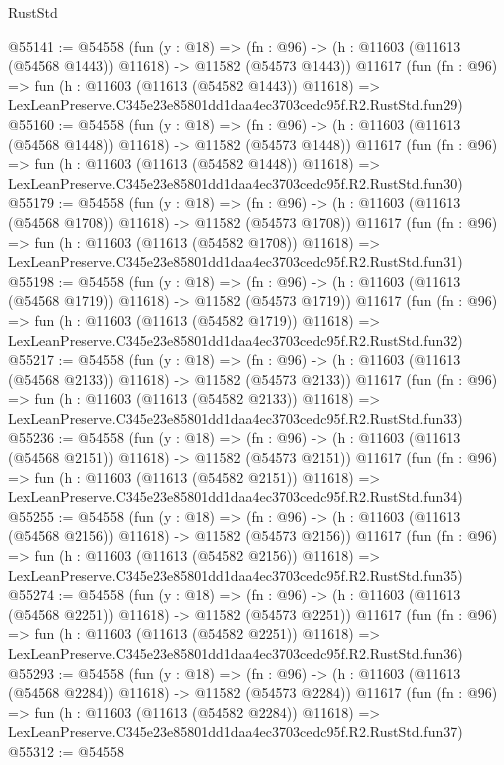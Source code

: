 \begin{lexlean}{RustStd}
\begin{coremodule}
@55141 := @54558
    (fun (y : @18) =>
    (fn : @96) -> (h : @11603 (@11613 (@54568 @1443)) @11618) -> @11582 (@54573 @1443))
    @11617
    (fun (fn : @96) =>
    fun (h : @11603 (@11613 (@54582 @1443)) @11618) =>
    LexLeanPreserve.C345e23e85801dd1daa4ec3703cedc95f.R2.RustStd.fun29)
@55160 := @54558
    (fun (y : @18) =>
    (fn : @96) -> (h : @11603 (@11613 (@54568 @1448)) @11618) -> @11582 (@54573 @1448))
    @11617
    (fun (fn : @96) =>
    fun (h : @11603 (@11613 (@54582 @1448)) @11618) =>
    LexLeanPreserve.C345e23e85801dd1daa4ec3703cedc95f.R2.RustStd.fun30)
@55179 := @54558
    (fun (y : @18) =>
    (fn : @96) -> (h : @11603 (@11613 (@54568 @1708)) @11618) -> @11582 (@54573 @1708))
    @11617
    (fun (fn : @96) =>
    fun (h : @11603 (@11613 (@54582 @1708)) @11618) =>
    LexLeanPreserve.C345e23e85801dd1daa4ec3703cedc95f.R2.RustStd.fun31)
@55198 := @54558
    (fun (y : @18) =>
    (fn : @96) -> (h : @11603 (@11613 (@54568 @1719)) @11618) -> @11582 (@54573 @1719))
    @11617
    (fun (fn : @96) =>
    fun (h : @11603 (@11613 (@54582 @1719)) @11618) =>
    LexLeanPreserve.C345e23e85801dd1daa4ec3703cedc95f.R2.RustStd.fun32)
@55217 := @54558
    (fun (y : @18) =>
    (fn : @96) -> (h : @11603 (@11613 (@54568 @2133)) @11618) -> @11582 (@54573 @2133))
    @11617
    (fun (fn : @96) =>
    fun (h : @11603 (@11613 (@54582 @2133)) @11618) =>
    LexLeanPreserve.C345e23e85801dd1daa4ec3703cedc95f.R2.RustStd.fun33)
@55236 := @54558
    (fun (y : @18) =>
    (fn : @96) -> (h : @11603 (@11613 (@54568 @2151)) @11618) -> @11582 (@54573 @2151))
    @11617
    (fun (fn : @96) =>
    fun (h : @11603 (@11613 (@54582 @2151)) @11618) =>
    LexLeanPreserve.C345e23e85801dd1daa4ec3703cedc95f.R2.RustStd.fun34)
@55255 := @54558
    (fun (y : @18) =>
    (fn : @96) -> (h : @11603 (@11613 (@54568 @2156)) @11618) -> @11582 (@54573 @2156))
    @11617
    (fun (fn : @96) =>
    fun (h : @11603 (@11613 (@54582 @2156)) @11618) =>
    LexLeanPreserve.C345e23e85801dd1daa4ec3703cedc95f.R2.RustStd.fun35)
@55274 := @54558
    (fun (y : @18) =>
    (fn : @96) -> (h : @11603 (@11613 (@54568 @2251)) @11618) -> @11582 (@54573 @2251))
    @11617
    (fun (fn : @96) =>
    fun (h : @11603 (@11613 (@54582 @2251)) @11618) =>
    LexLeanPreserve.C345e23e85801dd1daa4ec3703cedc95f.R2.RustStd.fun36)
@55293 := @54558
    (fun (y : @18) =>
    (fn : @96) -> (h : @11603 (@11613 (@54568 @2284)) @11618) -> @11582 (@54573 @2284))
    @11617
    (fun (fn : @96) =>
    fun (h : @11603 (@11613 (@54582 @2284)) @11618) =>
    LexLeanPreserve.C345e23e85801dd1daa4ec3703cedc95f.R2.RustStd.fun37)
@55312 := @54558

\end{coremodule}
\end{lexlean}
